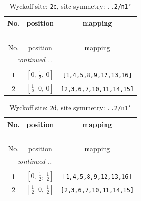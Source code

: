 \documentclass[fleqn,8pt]{jsarticle}
\begin{document}
\renewcommand{\arraystretch}{1.2}
\begin{longtable}{ccc}
\caption{Wyckoff site: {\tt 2c}, site symmetry: {\tt ..2/m1'}}
 \\
 \hline \hline
No. & position & mapping \\ \hline \endfirsthead

\multicolumn{2}{l}{\tablename\ \thetable{}} \\
 \hline \hline
No. & position & mapping \\ \hline \endhead

 \hline \hline
\multicolumn{2}{r}{\footnotesize\it continued ...} \\ \endfoot

 \hline \hline
\multicolumn{2}{r}{} \\ \endlastfoot

1 & $\left[ 0,\, \frac{1}{2},\, 0 \right]$ & {\tt [1,4,5,8,9,12,13,16]} \\ \hline
2 & $\left[ \frac{1}{2},\, 0,\, 0 \right]$ & {\tt [2,3,6,7,10,11,14,15]} \\
\end{longtable}
\renewcommand{\arraystretch}{1.2}
\begin{longtable}{ccc}
\caption{Wyckoff site: {\tt 2d}, site symmetry: {\tt ..2/m1'}}
 \\
 \hline \hline
No. & position & mapping \\ \hline \endfirsthead

\multicolumn{2}{l}{\tablename\ \thetable{}} \\
 \hline \hline
No. & position & mapping \\ \hline \endhead

 \hline \hline
\multicolumn{2}{r}{\footnotesize\it continued ...} \\ \endfoot

 \hline \hline
\multicolumn{2}{r}{} \\ \endlastfoot

1 & $\left[ 0,\, \frac{1}{2},\, \frac{1}{2} \right]$ & {\tt [1,4,5,8,9,12,13,16]} \\ \hline
2 & $\left[ \frac{1}{2},\, 0,\, \frac{1}{2} \right]$ & {\tt [2,3,6,7,10,11,14,15]} \\
\end{longtable}
\renewcommand{\arraystretch}{1.2}
\end{document}
